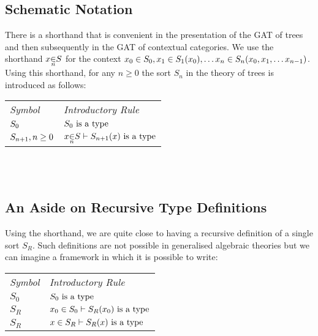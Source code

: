 \documentclass[10pt,a4paper]{scrartcl}
\begin{document}
\subsection {Schematic Notation}
\newcommand{\ft}[1]{
#1 \kern-6pt \raisebox{1.1ex}{$\leftrightline$} \kern-3pt \raisebox{.1ex}{$\downarrow$}}
\newcommand{\bbin}[1]{
\raisebox{-0.5em}{$\stackrel{\displaystyle{\in}} {\scriptstyle{#1}}$}
}
\newcommand{\ofTn}[3]{
#1 \bbin{#2} #3}

There is a  shorthand that is convenient in the presentation  of the GAT of trees  and then subsequently in the GAT of contextual categories. We use the shorthand
$\ofTn{x}{n}{S}$ for the context $x_0 \in S_0,x_1 \in S_{1}(x_0), \hdots x_n \in S_{n}(x_0,x_1,\hdots x_{n-1}) $. \\

\noindent Using this shorthand, for any $n \geq 0$ the sort $S_n$  in the theory of trees is introduced as follows: \\

\vspace{0.03cm} 
\begin{tabular}{>{\itshape}l l}
Symbol & \itshape{Introductory Rule} \\
$S_0  $     & $S_0\mbox{ is a type}$\\
$S_{n+1}, n \geq 0 $ & $\ofTn{x}{n}{S}    \tstyle \isT{\Si{n+1}(x)} $\\
\end{tabular} \\
\vspace{.1cm}  \\


\subsection {An Aside on Recursive Type Definitions}

Using the shorthand, we are quite close to having a recursive definition of a single sort $S_R$.
Such definitions are not possible in generalised algebraic theories but we can imagine a framework in which it is possible to write: \\
\vspace{0.03cm} 
\begin{tabular}{>{\itshape}l l}
Symbol & \itshape{Introductory Rule} \\
$S_0  $     & $S_0\mbox{ is a type}$\\
$S_R  $     & $x_0 \in S_0    \vdash S_R(x_0)\mbox{ is a type} $\\
$S_R $      & $x \in S_R    \vdash S_R(x)\mbox{ is a type} $\\
\end{tabular} \\
\vspace{.1cm}  \\
\end{document}
